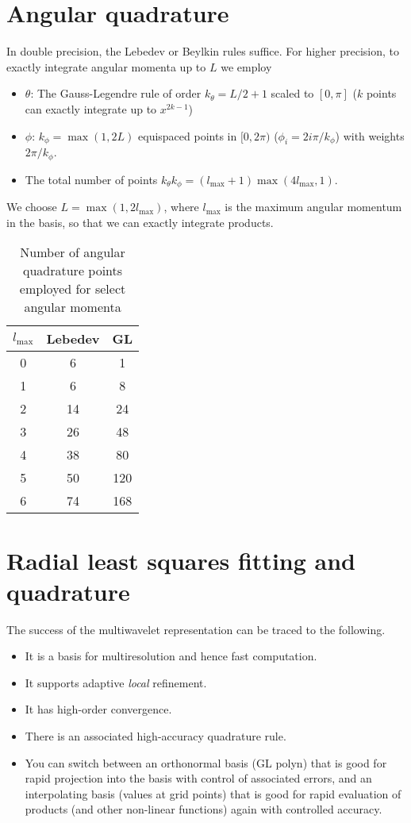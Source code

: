 \documentclass[12pt]{article}
\begin{document}
\section{Angular quadrature}
In double precision, the Lebedev or Beylkin rules suffice.  For higher precision, to exactly integrate angular momenta up to $L$  we employ
\begin{itemize}
\item $\theta$: The Gauss-Legendre rule of order $k_\theta = L/2 + 1$ scaled to $[0,\pi]$ ($k$ points can exactly integrate up to $x^{2k-1}$)
\item $\phi$: $k_\phi = \max(1,2 L)$ equispaced points in $[0,2 \pi)$ ($\phi_i = 2 i \pi / k_\phi$) with weights $2 \pi / k_\phi$.
 \item The total number of points $k_\theta k_\phi = (l_{\mbox{max}} + 1) \max(4 l_{\mbox{max}},1) $.
\end{itemize}
We choose $L = \max(1, 2 l_{\mbox{max}})$, where $l_{\mbox{max}}$ is the maximum angular momentum in the basis, so that we can exactly integrate products.

\begin{table}
  \begin{center}
  \caption{Number of angular quadrature points employed for select angular momenta}
  \begin{tabular}{ccc}
    $l_{\mbox{max}}$ & Lebedev & GL  \\ \hline
    0 & 6 & 1 \\
    1 & 6 & 8 \\
    2 & 14 & 24 \\
    3 & 26 & 48 \\
    4 & 38 & 80 \\
    5 & 50 & 120 \\
    6 & 74 & 168 \\ \hline
  \end{tabular}
  \end{center}
\end{table}

\section{Radial least squares fitting and quadrature}

The success of the multiwavelet representation can be traced to the following.
\begin{itemize}
\item It is a basis for multiresolution and hence fast computation.
\item It supports adaptive {\em local} refinement.
\item It has high-order convergence.
\item There is an associated high-accuracy quadrature rule.
\item You can switch between an orthonormal basis (GL polyn) that is good for rapid projection into the basis with control of associated errors, and an interpolating basis (values at grid points) that is good for rapid evaluation of products (and other non-linear functions) again with controlled accuracy.
\end{itemize}
\end{document}
